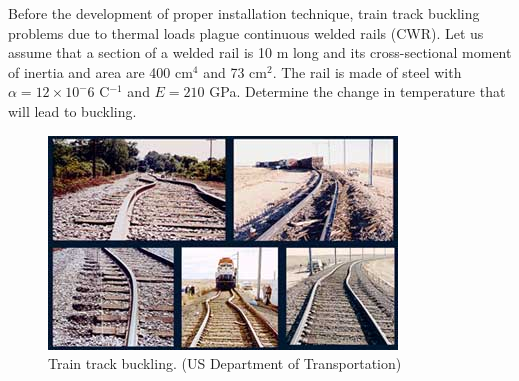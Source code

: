 \documentclass[
10pt,
a4paper,
openany,
svgnames,
]{book} %
\begin{document}
\begin{example}
  Before the development of proper installation technique, train track buckling problems due to thermal loads plague continuous welded rails (CWR). Let us assume that a section of a welded rail is 10 m long and its cross-sectional moment of inertia and area are 400 cm$^4$ and 73 cm$^2$. The rail is made of steel with $\alpha = 12 \times 10^-6$ C$^{-1}$ and $E = 210$ GPa. Determine the change in temperature that will lead to buckling.

  \begin{figure}[H]
    \centering
    \includegraphics[scale=0.7]{pictures/Failure-theories/Rail_buckle}
    \caption{Train track buckling. (US Department of Transportation)}
  \end{figure}
\end{example}
\end{document}
